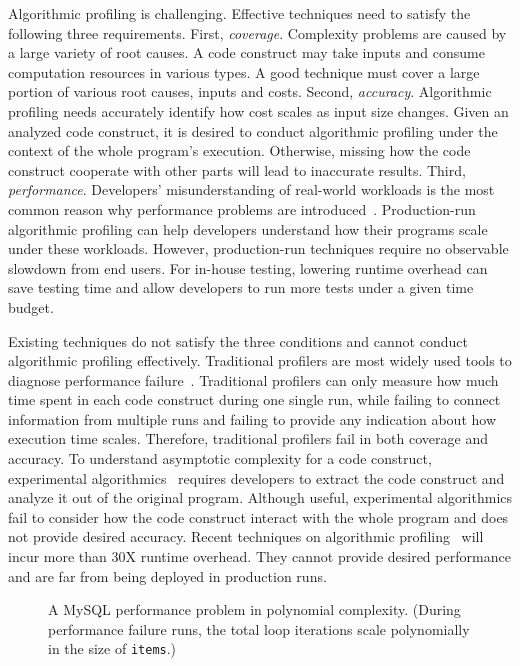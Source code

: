 Algorithmic profiling is challenging. 
Effective techniques need to satisfy the following three requirements.
First, \textit{coverage}. Complexity problems are caused by a large variety of root causes. 
A code construct may take inputs and consume computation resources in various types.
A good technique must cover a large portion of various root causes, inputs and costs.
Second, \textit{accuracy}. Algorithmic profiling needs accurately identify 
how cost scales as input size changes.
Given an analyzed code construct,
it is desired to conduct algorithmic profiling under the context of the whole program's execution. 
Otherwise, missing how the code construct cooperate with other parts will lead to inaccurate results. 
Third, \textit{performance}. 
Developers' misunderstanding of real-world workloads 
is the most common reason why performance problems are introduced~\cite{PerfBug}. 
Production-run algorithmic profiling can help developers 
understand how their programs scale under these workloads.
However, production-run techniques require no observable slowdown from end users. 
For in-house testing, lowering runtime overhead can save testing time 
and allow developers to run more tests under a given time budget. 

Existing techniques do not satisfy the three conditions and 
cannot conduct algorithmic profiling effectively. 
Traditional profilers are most widely used tools to 
diagnose performance failure~\cite{gprof,oprofile}. 
Traditional profilers can only measure how much time spent in each code construct during one single run, 
while failing to connect information from multiple runs 
and failing to provide any indication about how execution time scales.
Therefore, traditional profilers fail in both coverage and accuracy.  
To understand asymptotic complexity for a code construct,
experimental algorithmics~\cite{expalg1,expalg2,expalg3} requires developers to 
extract the code construct and analyze it out of the original program. 
Although useful,
experimental algorithmics fail to consider how the code 
construct interact with the whole program and does not provide desired accuracy. 
Recent techniques on algorithmic profiling~\cite{Aprof1,Aprof2,AlgoProf} will incur more than 30X runtime overhead.
They cannot provide desired performance and are far from being deployed in production runs. 


\begin{figure}
\centering
{}
  \mbox{}
\caption{A MySQL performance problem in polynomial complexity. 
\footnotesize{(During performance failure runs, 
   the total loop iterations scale polynomially in the size of \texttt{items}.)}}
\vspace{-0.05in}
\label{fig:mysql27287}
\vspace{-0.05in}
\end{figure}



